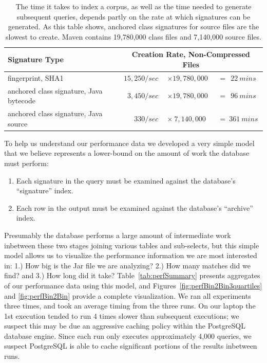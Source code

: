 

\begin{table}[h]
  \centering
\begin{tabular}[htbp]{l|r@{}l@{}l}
\textbf{Signature Type}   & \multicolumn{3}{c}{\textbf{Creation Rate, Non-Compressed Files}} \\
\hline
fingerprint, SHA1                         & $15,250 / sec~$ & $\times 19,780,000$ & $~= ~~22 ~mins$ \\
anchored class signature, Java bytecode   & $ 3,450 / sec~$ & $\times 19,780,000$ & $~= ~~96 ~mins$ \\
anchored class signature, Java source     & $   330 / sec~$ & $\times ~7,140,000$ & $~= ~361 ~mins$ \\
\end{tabular}
  \caption{
The time it takes to index a corpus, as well as the time needed to generate subsequent queries,
depends partly on the rate at which signatures can be generated.  As this table shows,
anchored class signatures for source files are the slowest to create.  Maven
contains 19,780,000 class files and 7,140,000 source files.
  }
  \label{tab:sigCreationSpeed}
\end{table}


To help us understand our performance data we developed a very simple
model that we believe represents a lower-bound on the amount of work
the database must perform:

\begin{enumerate}

\item Each signature in the query must be examined against the database's ``signature'' index.

\item Each row in the output must be examined against the database's ``archive'' index.

\end{enumerate}

Presumably the database performs a large amount of intermediate work inbetween these two stages joining
various tables and sub-selects, but this simple model allows us to visualize the
performance information we are most interested in:  1.) How big is the Jar file we are analyzing?  2.) How many matches
did we find? and 3.) How long did it take?
Table~\ref{tab:perfSummary} presents aggregates of our performance data using this model,
and Figures~\ref{fig:perfBin2Bin3quartiles} and \ref{fig:perfBin2Bin}
provide a complete visualization.  We ran all experiments three times, and took an average timing
from the three runs.  On our laptop the 1st execution tended to run 4 times slower than subsequent executions; we suspect
this may be due an aggressive caching policy within the PostgreSQL database engine.
Since each run only executes approximately 4,000 queries, we suspect PostgreSQL is able to
cache significant portions of the results inbetween runs.


